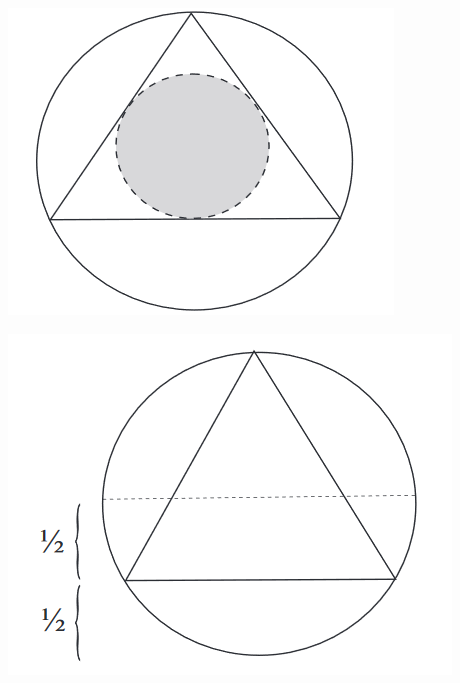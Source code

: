 \documentclass[12pt]{beamer}
\begin{document}
\begin{frame}
  \includegraphics[width=\textwidth]{Bernard_2.png}
\end{frame}
\begin{frame}
  \includegraphics[width=\textwidth]{Bernard_3.png}
\end{frame}
\end{document}
